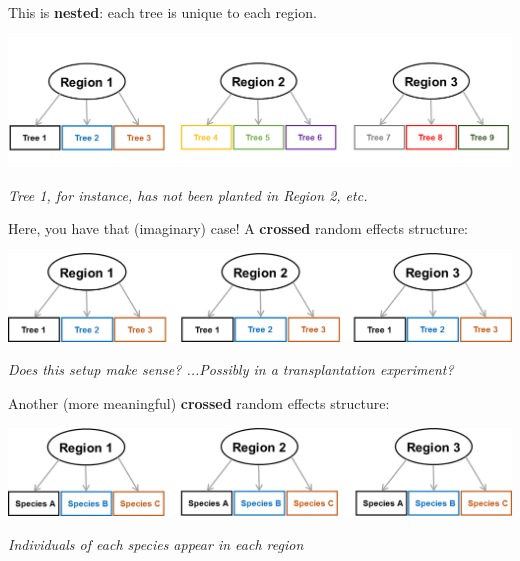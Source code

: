 \documentclass{beamer}
\begin{document}
\begin{frame}
    \Large
    This is \textbf{nested}: each tree is unique to each region. 
    \vspace{0.2cm}
    
    \begin{center}
        \includegraphics[width=\textwidth]{lectures/day_5_theory_of_mems/figures/two_RE_nested.png}
    \end{center}
    \vspace{0.2cm}

    \textit{Tree 1, for instance, has not been planted in Region 2, etc.}
\end{frame}

\begin{frame}
    \Large
    Here, you have that (imaginary) case! A \textbf{crossed} random effects structure:
    \vspace{0.2cm}
    
    \begin{center}
        \includegraphics[width=\textwidth]{lectures/day_5_theory_of_mems/figures/Crossed_ind.trees.png}
    \end{center}
    \vspace{0.2cm}

    \textit{Does this setup make sense? ...Possibly in a transplantation experiment?}
\end{frame}

\begin{frame}
    \Large
    Another (more meaningful) \textbf{crossed} random effects structure:
    \vspace{0.2cm}
    
    \begin{center}
        \includegraphics[width=\textwidth]{lectures/day_5_theory_of_mems/figures/two_RE_crossed.png}
    \end{center}
    \vspace{0.2cm}

    \textit{Individuals of each species appear in each region}
\end{frame}
\end{document}

